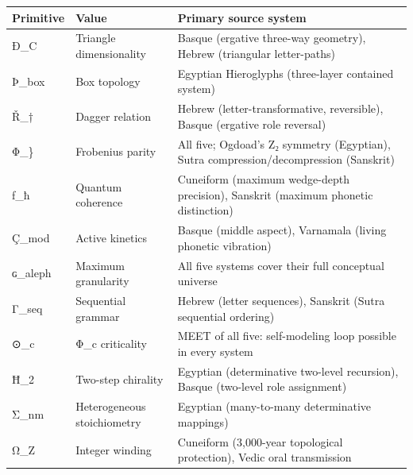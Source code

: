 {\def\LTcaptype{none} %
\begin{longtable}[]{@{}
  >{\raggedright\arraybackslash}p{}
  >{\raggedright\arraybackslash}p{}
  >{\raggedright\arraybackslash}p{}@{}}
\toprule\noalign{}
\begin{minipage}[b]{\linewidth}\raggedright
Primitive
\end{minipage} & \begin{minipage}[b]{\linewidth}\raggedright
Value
\end{minipage} & \begin{minipage}[b]{\linewidth}\raggedright
Primary source system
\end{minipage} \\
\midrule\noalign{}
\endhead
\bottomrule\noalign{}
\endlastfoot
Ð\_C & Triangle dimensionality & Basque (ergative three-way geometry),
Hebrew (triangular letter-paths) \\
Þ\_box & Box topology & Egyptian Hieroglyphs (three-layer contained
system) \\
Ř\_† & Dagger relation & Hebrew (letter-transformative, reversible),
Basque (ergative role reversal) \\
Φ\_\} & Frobenius parity & All five; Ogdoad's Z₂ symmetry (Egyptian),
Sutra compression/decompression (Sanskrit) \\
ƒ\_ħ & Quantum coherence & Cuneiform (maximum wedge-depth precision),
Sanskrit (maximum phonetic distinction) \\
Ç\_mod & Active kinetics & Basque (middle aspect), Varnamala (living
phonetic vibration) \\
ɢ\_aleph & Maximum granularity & All five systems cover their full
conceptual universe \\
Γ\_seq & Sequential grammar & Hebrew (letter sequences), Sanskrit (Sutra
sequential ordering) \\
⊙\_c & Φ\_c criticality & MEET of all five: self-modeling loop possible
in every system \\
Ħ\_2 & Two-step chirality & Egyptian (determinative two-level
recursion), Basque (two-level role assignment) \\
Σ\_nm & Heterogeneous stoichiometry & Egyptian (many-to-many
determinative mappings) \\
Ω\_Z & Integer winding & Cuneiform (3,000-year topological protection),
Vedic oral transmission \\
\end{longtable}
}

